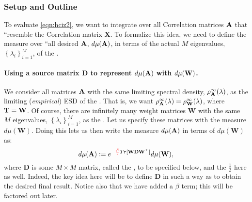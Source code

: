 \subsubsection{Setup and Outline}
\label{sxn:tanaka_setup}

\noindent
To evaluate \ref{eqn:hciz2},
we %
want to integrate over all \Student Correlation matrices $\mathbf{\mathbf{A}}$
that ``resemble the \Teacher Correlation matrix $\mathbf{X}$.  
To %
formalize this idea,
we need to %
define the measure over ``all desired $\mathbf{\mathbf{A}}$, $d\mu(\mathbf{\mathbf{A}})$, 
in 
terms of the actual $M$ eigenvalues, $\left\{ \lambda_{i} \right\}_{i=1}^{M}$, of the \Teacher.



\paragraph{Using a source matrix $\mathbf{D}$ to represent $d\mu(\mathbf{A})$ with $d\mu({\mathbf{W}})$.}

We consider all matrices $\mathbf{\mathbf{A}}$ with the same limiting spectral density, $\rho_{\mathbf{A}}^{\infty}(\lambda)$,
as the limiting (\emph{empirical}) ESD of the \Teacher.
That is, we want $\rho_{\mathbf{A}}^{\infty}(\lambda)=\rho^{\infty}_{{\mathbf{W}}}(\lambda)$, where ${\mathbf{T}}={\mathbf{W}}$.
Of course, there are infinitely many weight matrices $\mathbf{W}$ with the same $M$ eigenvalues, $\left\{ \lambda_{i} \right\}_{i=1}^{M}$, as the \Teacher.
Let us specify these matrices with the measure $d\mu(\mathbf{W})$.
Doing this lets us then write the measure $d\mu(\mathbf{\mathbf{A}})$ in terms of $d\mu(\mathbf{W})$ as:
\begin{equation}
\label{eqn:dmuA}
d\mu(\mathbf{\mathbf{A}}) 
   := e^{- {\color{red}\sf{\frac{\beta}{2}}} Tr[\mathbf{W}\mathbf{D}\mathbf{W}^{\top}]} d\mu(\mathbf{W})  ,
\end{equation}
where $\mathbf{D}$ is some $M \times M$ matrix, called the \SourceMatrix, to be specified below,
and the $\tfrac{1}{2}$ here as well.
Indeed, the key idea here will be to define $\mathbf{D}$ in such a way as to obtain the desired final result.
Notice also that we have added a $\beta$ term; this will be factored out later.

